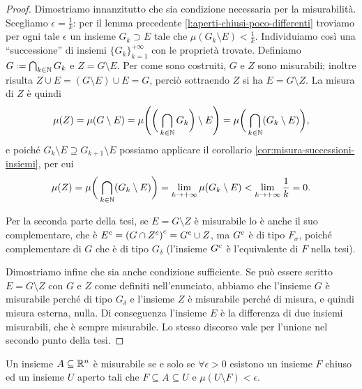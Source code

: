 \begin{proof}
	Dimostriamo innanzitutto che sia condizione necessaria per la misurabilità.
	Scegliamo $\epsilon=\frac1{k}$: per il lemma precedente \ref{l:aperti-chiusi-poco-differenti} troviamo per ogni tale $\epsilon$ un insieme $G_k\supset E$ tale che $\mu(G_k\setminus E)<\frac1{k}$.
	Individuiamo cos\`i una ``successione'' di insiemi $\{G_k\}_{k=1}^{+\infty}$ con le proprietà trovate.
	Definiamo $G\defeq\bigcap_{k\in\N}G_k$ e $Z=G\setminus E$.
	Per come sono costruiti, $G$ e $Z$ sono misurabili; inoltre risulta $Z\cup E=(G\setminus E)\cup E=G$, perciò sottraendo $Z$ si ha $E=G\setminus Z$.
	La misura di $Z$ è quindi
	\begin{equation}
		\mu(Z)=\mu(G\setminus E)=\mu\Bigg(\bigg(\bigcap_{k\in\mathbb{N}}G_k\bigg)\setminus E\Bigg)=\mu\bigg(\bigcap_{k\in\mathbb{N}}(G_k\setminus E)\bigg),
	\end{equation}
	e poich\'e $G_k\setminus E\supseteq G_{k+1}\setminus E$ possiamo applicare il corollario \ref{cor:misura-successioni-insiemi}, per cui	
	\begin{equation}
		\mu(Z)=\mu\bigg(\bigcap_{k\in\mathbb{N}}(G_k\setminus E)\bigg)=\lim_{k\to+\infty}\mu(G_k\setminus E)<\lim_{k\to+\infty}\frac1{k}=0.
	\end{equation}

	Per la seconda parte della tesi, se $E=G\setminus Z$ è misurabile lo è anche il suo complementare, che è ${E}^c={(G\cap{Z}^c)}^c={G}^c\cup Z$, ma ${G}^c$ è di tipo $F_\sigma$, poich\'e complementare di $G$ che è di tipo $G_\delta$ (l'insieme ${G}^c$ è l'equivalente di $F$ nella tesi).
	
	Dimostriamo infine che sia anche condizione sufficiente.
	Se può essere scritto $E=G\setminus Z$ con $G$ e $Z$ come definiti nell'enunciato, abbiamo che l'insieme $G$ è misurabile perché di tipo $G_\delta$ e l'insieme $Z$ è misurabile perché di misura, e quindi misura esterna, nulla. Di conseguenza l'insieme $E$ è la differenza di due insiemi misurabili, che è sempre misurabile. Lo stesso discorso vale per l'unione nel secondo punto della tesi.
\end{proof}
\begin{teorema}
	Un insieme $A\subseteq\mathbb{R}^n$ è misurabile se e solo se $\forall\epsilon>0$ esistono un insieme $F$ chiuso ed un insieme $U$ aperto tali che $F\subseteq A\subseteq U$ e $\mu(U\setminus F)<\epsilon$.
\end{teorema}
